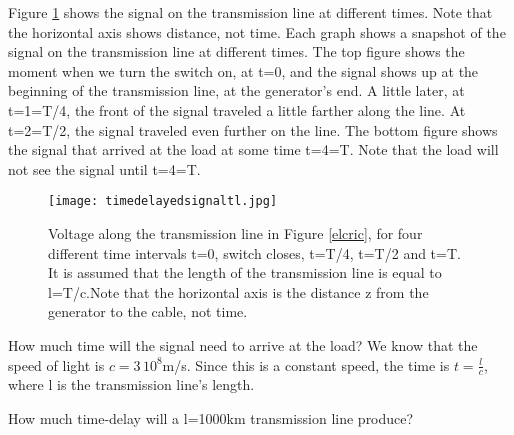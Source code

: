\documentclass{ximera}
\begin{document}
Figure \ref{delayedsig} shows the signal on the transmission line at different times. Note that the horizontal axis shows distance, not time. Each graph shows a snapshot of the signal on the transmission line at different times. The top figure shows the moment when we turn the switch on, at t=0, and the signal shows up at the beginning of the transmission line, at the generator's end. A little later, at t=1=T/4, the front of the signal traveled a little farther along the line. At t=2=T/2, the signal traveled even further on the line. The bottom figure shows the signal that arrived at the load at some time t=4=T. Note that the load will not see the signal until t=4=T. 



\begin{figure}[htbp]
\begin{center}
\texttt{[image: timedelayedsignaltl.jpg]}
\end{center}
\caption{Voltage along the transmission line in Figure \ref{elcric}, for four different time intervals t=0, switch closes, t=T/4, t=T/2 and t=T. It is assumed that the length of the transmission line is equal to l=T/c.Note that the horizontal axis is the distance z from the generator to the cable, not time. }
\label{delayedsig}
\end{figure}

How much time will the signal need to arrive at the load? We know that the speed of light is $c=3\,10^8$m/s. Since this is a constant speed, the time is $t=\frac{l}{c}$, where l is the transmission line's length.

\begin{question}  
How much time-delay will a l=1000km transmission line produce?  
\begin{multipleChoice}  
\end{multipleChoice}  
\end{question} 
\end{document}
